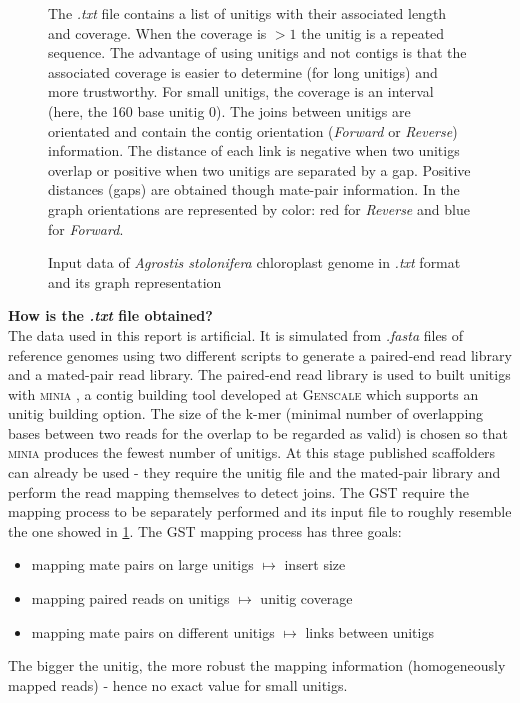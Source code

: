 \documentclass[12pt]{article}
\begin{document}
\begin{figure}[h!]
{
}
\caption{Input data of \textit{Agrostis stolonifera} chloroplast genome in \textit{.txt} format and its graph representation}
\label{fig:inpagrostis}
\scriptsize The \textit{.txt} file contains a list of unitigs with their associated length and coverage. When the coverage is $>1$ the unitig is a repeated sequence. The advantage of using unitigs and not contigs is that the associated coverage is easier to determine (for long unitigs) and more trustworthy. For small unitigs, the coverage is an interval (here, the 160 base unitig 0). The joins between unitigs are orientated and contain the contig orientation (\textit{Forward} or \textit{Reverse}) information. The distance of each link is negative when two unitigs overlap or positive when two unitigs are separated by a gap. Positive distances (gaps) are obtained though mate-pair information. In the graph orientations are represented by color: red for \textit{Reverse} and blue for \textit{Forward}.
\end{figure}

\vspace{-0.2cm}
\textbf{How is the \textit{.txt} file obtained? }\\
The data used in this report is artificial. It is simulated from \textit{.fasta} files of reference genomes using two different scripts to generate a paired-end read library and a mated-pair read library. The paired-end read library is used to built unitigs with \textsc{minia} \cite{cascading,minia}, a contig building tool developed at \textsc{Genscale} which supports an unitig building option. The size of the k-mer (minimal number of overlapping bases between two reads for the overlap to be regarded as valid) is chosen so that \textsc{minia} produces the fewest number of unitigs. At this stage published scaffolders can already be used - they require the unitig file and the mated-pair library and perform the read mapping themselves to detect joins. The GST require the mapping process to be separately performed and its input file to roughly resemble the one showed in \ref{fig:inpagrostis}. The GST mapping process has three goals:
\begin{itemize}
\item mapping mate pairs on large unitigs $\mapsto$ insert size
\item mapping paired reads on unitigs $\mapsto$ unitig coverage
\item mapping mate pairs on different unitigs $\mapsto$ links between unitigs
\end{itemize}
The bigger the unitig, the more robust the mapping information (homogeneously mapped reads) - hence no exact value for small unitigs.
\end{document}
